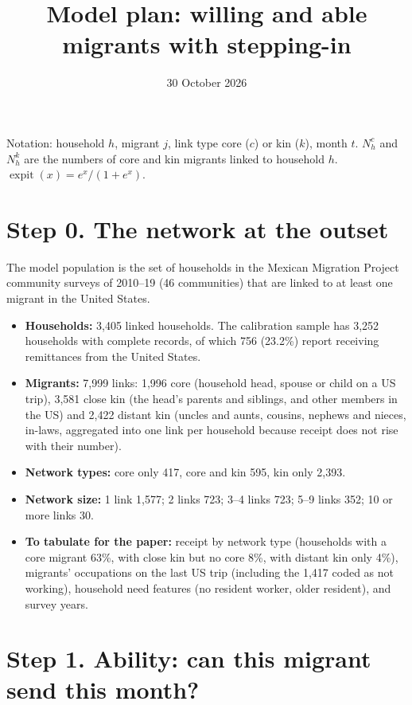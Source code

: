 \documentclass[11pt]{article}
\title{Model plan: willing and able migrants with stepping-in}
\author{}
\date{30 October 2026}
\newcommand{\expit}{\operatorname{expit}}
\begin{document}
\maketitle

\noindent Notation: household $h$, migrant $j$, link type core ($c$) or kin ($k$), month $t$. $N^c_h$ and $N^k_h$ are the numbers of core and kin migrants linked to household $h$. $\expit(x) = e^x/(1+e^x)$.

\section*{Step 0. The network at the outset}

The model population is the set of households in the Mexican Migration Project community surveys of 2010--19 (46 communities) that are linked to at least one migrant in the United States.

\begin{itemize}[leftmargin=*]
\item \textbf{Households:} 3,405 linked households. The calibration sample has 3,252 households with complete records, of which 756 (23.2\%) report receiving remittances from the United States.
\item \textbf{Migrants:} 7,999 links: 1,996 core (household head, spouse or child on a US trip), 3,581 close kin (the head's parents and siblings, and other members in the US) and 2,422 distant kin (uncles and aunts, cousins, nephews and nieces, in-laws, aggregated into one link per household because receipt does not rise with their number).
\item \textbf{Network types:} core only 417, core and kin 595, kin only 2,393.
\item \textbf{Network size:} 1 link 1,577; 2 links 723; 3--4 links 723; 5--9 links 352; 10 or more links 30.
\item \textbf{To tabulate for the paper:} receipt by network type (households with a core migrant 63\%, with close kin but no core 8\%, with distant kin only 4\%), migrants' occupations on the last US trip (including the 1,417 coded as not working), household need features (no resident worker, older resident), and survey years.
\end{itemize}

\section*{Step 1. Ability: can this migrant send this month?}
\end{document}
